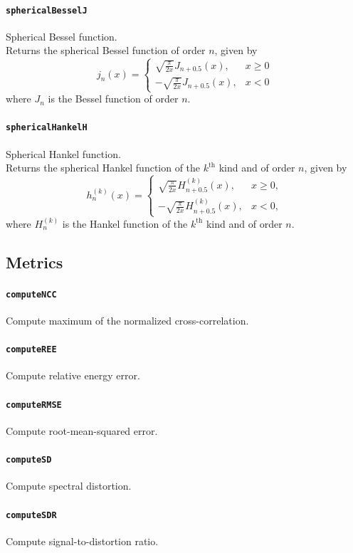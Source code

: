 \documentclass[11pt, oneside]{article}
\newcommand{\function}[1]{\paragraph*{\texttt{#1}}}
\begin{document}
\function{sphericalBesselJ} Spherical Bessel function. \\
Returns the spherical Bessel function of order $n$, given by
\begin{equation}
j_n(x) =
\begin{cases}
\displaystyle \sqrt{\frac{\pi}{2 x}} J_{n+0.5}(x), & x \geq 0 \\
\displaystyle -\sqrt{\frac{\pi}{2 x}} J_{n+0.5}(x), & x < 0
\end{cases}
\end{equation}
where $J_n$ is the Bessel function of order $n$.

\function{sphericalHankelH} Spherical Hankel function. \\
Returns the spherical Hankel function of the $k^\text{th}$ kind and of order $n$, given by
\begin{equation}
h^{(k)}_n(x) =
\begin{cases}
\displaystyle \sqrt{\frac{\pi}{2 x}} H^{(k)}_{n+0.5}(x), & x \geq 0, \\
\displaystyle -\sqrt{\frac{\pi}{2 x}} H^{(k)}_{n+0.5}(x), & x < 0,
\end{cases}
\end{equation}
where $H^{(k)}_n$ is the Hankel function of the $k^\text{th}$ kind and of order $n$.

\subsection{Metrics}

\function{computeNCC} Compute maximum of the normalized cross-correlation. \\

\function{computeREE} Compute relative energy error. \\

\function{computeRMSE} Compute root-mean-squared error. \\

\function{computeSD} Compute spectral distortion. \\

\function{computeSDR} Compute signal-to-distortion ratio. \\
\end{document}
